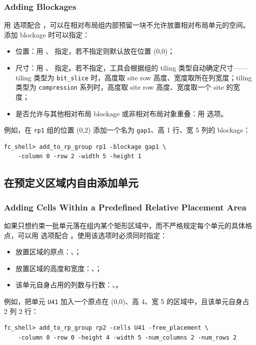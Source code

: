 \subsubsection*{Adding Blockages}

用  选项配合 ，可以在相对布局组内部预留一块不允许放置相对布局单元的空间。添加 blockage 时可以指定：
\begin{itemize}
  \item 位置：用 、 指定，若不指定则默认放在位置 (0,0)；
  \item 尺寸：用 、 指定。若不指定，工具会根据组的 tiling 类型自动确定尺寸——tiling 类型为 \texttt{bit\_slice} 时，高度取 site row 高度、宽度取所在列宽度；tiling 类型为 \texttt{compression} 系列时，高度取 site row 高度、宽度取一个 site 的宽度；
  \item 是否允许与其他相对布局 blockage 或非相对布局对象重叠：用  选项。
\end{itemize}

例如，在 \texttt{rp1} 组的位置 (0,2) 添加一个名为 \texttt{gap1}、高 1 行、宽 5 列的 blockage：
\begin{lstlisting}
fc_shell> add_to_rp_group rp1 -blockage gap1 \
    -column 0 -row 2 -width 5 -height 1
\end{lstlisting}

\subsection{在预定义区域内自由添加单元}
\subsubsection*{Adding Cells Within a Predefined Relative Placement Area}

如果只想约束一批单元落在组内某个矩形区域中，而不严格规定每个单元的具体格点，可以用  选项配合 。使用该选项时必须同时指定：
\begin{itemize}
  \item 放置区域的原点：、；
  \item 放置区域的高度和宽度：、；
  \item 该单元自身占用的列数与行数：、。
\end{itemize}

例如，把单元 \texttt{U41} 加入一个原点在 (0,0)、高 4、宽 5 的区域中，且该单元自身占 2 列 2 行：
\begin{lstlisting}
fc_shell> add_to_rp_group rp2 -cells U41 -free_placement \
    -column 0 -row 0 -height 4 -width 5 -num_columns 2 -num_rows 2
\end{lstlisting}

